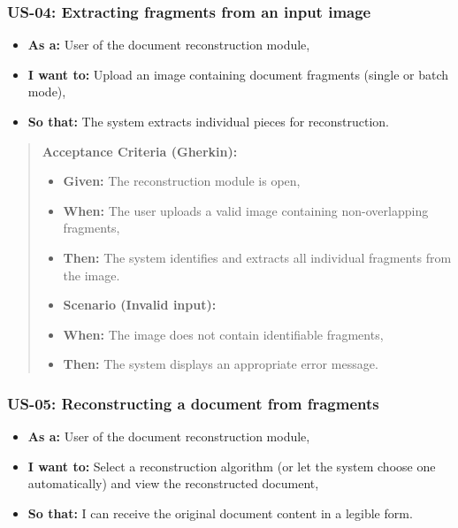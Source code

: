 \documentclass[
]{article}
\providecommand{\tightlist}{%
  \setlength{\itemsep}{0pt}\setlength{\parskip}{0pt}}
\begin{document}
\subsubsection{\texorpdfstring{\textbf{US-04: Extracting fragments from
an input
image}}{US-04: Extracting fragments from an input image}}\label{us-04-extracting-fragments-from-an-input-image}

\begin{itemize}
\tightlist
\item
  \textbf{As a:} User of the document reconstruction module,
\item
  \textbf{I want to:} Upload an image containing document fragments
  (single or batch mode),
\item
  \textbf{So that:} The system extracts individual pieces for
  reconstruction.
\end{itemize}

\begin{quote}
\textbf{Acceptance Criteria (Gherkin):}

\begin{itemize}
\tightlist
\item
  \textbf{Given:} The reconstruction module is open,
\item
  \textbf{When:} The user uploads a valid image containing
  non-overlapping fragments,
\item
  \textbf{Then:} The system identifies and extracts all individual
  fragments from the image.
\item
  \textbf{Scenario (Invalid input):}
\item
  \textbf{When:} The image does not contain identifiable fragments,
\item
  \textbf{Then:} The system displays an appropriate error message.
\end{itemize}
\end{quote}

\subsubsection{\texorpdfstring{\textbf{US-05: Reconstructing a document
from
fragments}}{US-05: Reconstructing a document from fragments}}\label{us-05-reconstructing-a-document-from-fragments}

\begin{itemize}
\tightlist
\item
  \textbf{As a:} User of the document reconstruction module,
\item
  \textbf{I want to:} Select a reconstruction algorithm (or let the
  system choose one automatically) and view the reconstructed document,
\item
  \textbf{So that:} I can receive the original document content in a
  legible form.
\end{itemize}
\end{document}

